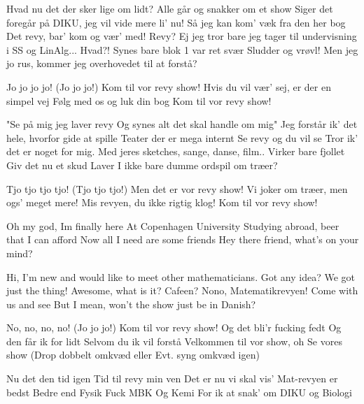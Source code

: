 \documentclass[a4paper,11pt]{article}
\begin{document}
\begin{song}

 Hvad nu det der sker lige om lidt?
Alle går og snakker om et show
Siger det foregår på DIKU, jeg vil vide mere li' nu!
Så jeg kan kom' væk fra den her bog
 Det revy, bar' kom og vær' med!
  Revy? Ej jeg tror bare jeg tager til undervisning i SS og LinAlg...
  Hvad?!
  Synes bare blok 1 var ret svær
 Sludder og vrøvl!
  Men jeg jo rus, kommer jeg overhovedet til at forstå?

 Jo jo jo jo! (Jo jo jo!)
Kom til vor revy show!
Hvis du vil vær' sej, er der en simpel vej
Følg med os og luk din bog
Kom til vor revy show!

  "Se på mig jeg laver revy
Og synes alt det skal handle om mig"
Jeg forstår ik' det hele, hvorfor gide at spille
Teater der er mega internt
 Se revy og du vil se
  Tror ik' det er noget for mig. Med jeres sketches, sange, danse, film.. Virker bare fjollet
 Giv det nu et skud
  Laver I ikke bare dumme ordspil om træer?

 Tjo tjo tjo tjo! (Tjo tjo tjo!)
Men det er vor revy show!
Vi joker om træer, men ogs' meget mere!
Mis revyen, du ikke rigtig klog!
Kom til vor revy show!

 Oh my god, Im finally here
At Copenhagen University
Studying abroad, beer that I can afford
Now all I need are some friends
 Hey there friend, what's on your mind?

 
Hi, I'm new and would like to meet other mathematicians. Got any idea?
  We got just the thing!
  Awesome, what is it? Cafeen?
  Nono, Matematikrevyen!
 Come with us and see
  But I mean, won't the show just be in Danish?

 No, no, no, no!  (Jo jo jo!)
Kom til vor revy show!
Og det bli'r fucking fedt
Og den får ik for lidt
Selvom du ik vil forstå
Velkommen til vor show, oh
Se vores show
(Drop dobbelt omkvæd eller Evt. syng omkvæd igen)

 Nu det den tid igen
Tid til revy min ven
Det er nu vi skal vis'
Mat-revyen er bedst
Bedre end Fysik
 Fuck MBK
 Og Kemi
For ik at snak' om DIKU og Biologi


\end{song}
\end{document}
